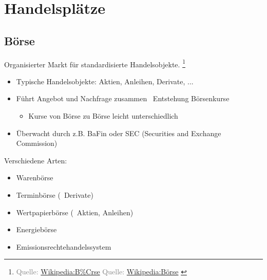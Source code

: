 \documentclass{beamer}
\let\oldfootnote\footnote
\renewcommand{\footnote}[1]
{%
	\oldfootnote
	{
		\tiny
		\textcolor{gray}{#1}
	}%
}
\newcommand{\citewiki}[2][]
{%
	\footnote
	{
		\ifthenelse{\isempty{#1}}
		{
			Quelle: \href{https://de.wikipedia.org/wiki/#2}{Wikipedia:#2}
		}
		{
			Quelle: \href{https://de.wikipedia.org/wiki/#2}{Wikipedia:#1}
		}
	}
}
\begin{document}
	\section{Handelsplätze}
	
		\begin{frame}
		\end{frame}
	
		\subsection{Börse}
		
			\begin{frame}
				\begin{definition}
					Organisierter Markt für standardisierte Handelsobjekte.\citewiki[Börse]{B\%Crse}
				\end{definition}
				\begin{itemize}
					\item Typische Handelsobjekte: Aktien, Anleihen, Derivate, ...
					\item Führt Angebot und Nachfrage zusammen \textrightarrow\ Entstehung Börsenkurse
					\begin{itemize}
						\item Kurse von Börse zu Börse leicht unterschiedlich
					\end{itemize}
					\item Überwacht durch z.B. BaFin oder SEC (Securities and Exchange Commission)
				\end{itemize}
			\end{frame}
		
			\begin{frame}
				Verschiedene Arten:
				\begin{itemize}
					\item Warenbörse
					\item Terminbörse (\textrightarrow\ Derivate)
					\item Wertpapierbörse (\textrightarrow\ Aktien, Anleihen)
					\item Energiebörse
					\item Emissionsrechtehandelssystem
				\end{itemize}
			\end{frame}
		
\end{document}

